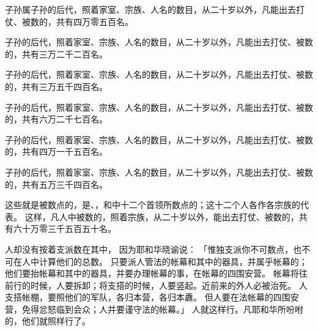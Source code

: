 {\par }{\PP {}子孙属{}子孙的后代，照着家室、宗族、人名的数目，从二十岁以外，凡能出去打仗、被数的，共有四万零五百名。
\par }{\PP {}子孙的后代，照着家室、宗族、人名的数目，从二十岁以外，凡能出去打仗、被数的，共有三万二千二百名。
\par }{\PP {}子孙的后代，照着家室、宗族、人名的数目，从二十岁以外，凡能出去打仗、被数的，共有三万五千四百名。
\par }{\PP {}子孙的后代，照着家室、宗族、人名的数目，从二十岁以外，凡能出去打仗、被数的，共有六万二千七百名。
\par }{\PP {}子孙的后代，照着家室、宗族、人名的数目，从二十岁以外，凡能出去打仗、被数的，共有四万一千五百名。
\par }{\PP {}子孙的后代，照着家室、宗族、人名的数目，从二十岁以外，凡能出去打仗、被数的，共有五万三千四百名。
\par }{\PP {}这些就是被数点的，是{}、{}，和{}中十二个首领所数点的；这十二个人各作各宗族的代表。
这样，凡{}人中被数的，照着宗族，从二十岁以外，能出去打仗、被数的，共有六十万零三千五百五十名。
\par }{\PP {}人却没有按着支派数在其中，
因为耶和华晓谕{}说：
「惟独{}支派你不可数点，也不可在{}人中计算他们的总数。
只要派{}人管法{}的帐幕和其中的器具，并属乎帐幕的；他们要抬帐幕和其中的器具，并要办理帐幕的事，在帐幕的四围安营。
帐幕将往前行的时候，{}人要拆卸；将支搭的时候，{}人要竖起。近前来的外人必被治死。
人支搭帐棚，要照他们的军队，各归本营，各归本纛。
但{}人要在法{}帐幕的四围安营，免得忿怒临到{}会众；{}人并要谨守法{}的帐幕。」
人就这样行。凡耶和华所吩咐{}的，他们就照样行了。

}
